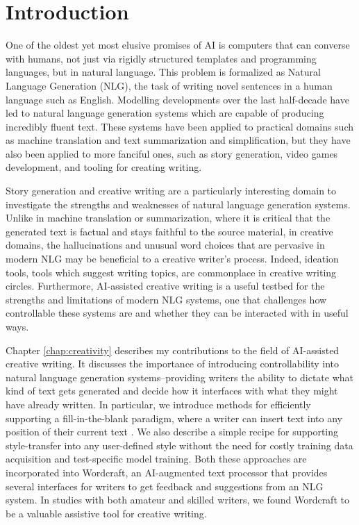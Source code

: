 \chapter{Introduction} \label{chap:intro}

One of the oldest yet most elusive promises of AI is computers that can converse with humans, not just via rigidly structured templates and programming languages, but in natural language.
This problem is formalized as Natural Language Generation (NLG), the task of writing novel sentences in a human language such as English. 
Modelling developments over the last half-decade have led to natural language generation systems which are capable of producing incredibly fluent text.
These systems have been applied to practical domains such as machine translation and text summarization and simplification, but they have also been applied to more fanciful ones, such as story generation, video games development, and tooling for creating writing.

Story generation and creative writing are a particularly interesting domain to investigate the strengths and weaknesses of natural language generation systems.
Unlike in machine translation or summarization, where it is critical that the generated text is factual and stays faithful to the source material, in creative domains, the hallucinations and unusual word choices that are pervasive in modern NLG may be beneficial to a creative writer's process.
Indeed, ideation tools, tools which suggest writing topics, are commonplace in creative writing circles.
Furthermore, AI-assisted creative writing is a useful testbed for the strengths and limitations of modern NLG systems, one that challenges how controllable these systems are and whether they can be interacted with in useful ways.

Chapter \ref{chap:creativity} describes my contributions to the field of AI-assisted creative writing. 
It discusses the importance of introducing controllability into natural language generation systems--providing writers the ability to dictate what kind of text gets generated and decide how it interfaces with what they might have already written.
In particular, we introduce methods for efficiently supporting a fill-in-the-blank paradigm, where a writer can insert text into any position of their current text .
We also describe a simple recipe for supporting style-transfer into any user-defined style without the need for costly training data acquisition and test-specific model training.
Both these approaches are incorporated into Wordcraft, an AI-augmented text processor that provides several interfaces for writers to get feedback and suggestions from an NLG system.
In studies with both amateur and skilled writers, we found Wordcraft to be a valuable assistive tool for creative writing.

